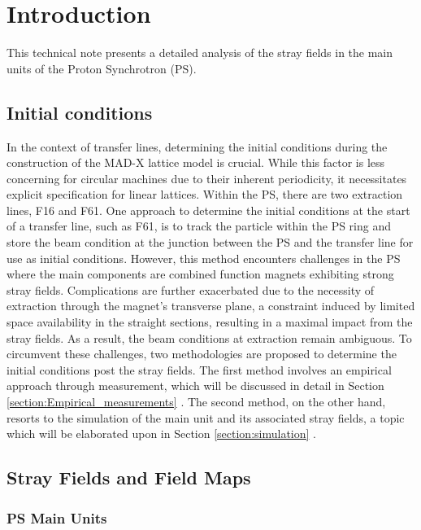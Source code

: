 \section{Introduction}

This technical note presents a detailed analysis of the stray fields in the main units of the Proton Synchrotron (PS).

\subsection{Initial conditions}

In the context of transfer lines, determining the initial conditions during the construction of the MAD-X lattice model is crucial. While this factor is less concerning for circular machines due to their inherent periodicity, it necessitates explicit specification for linear lattices. Within the PS, there are two extraction lines, F16 and F61. One approach to determine the initial conditions at the start of a transfer line, such as F61, is to track the particle within the PS ring and store the beam condition at the junction between the PS and the transfer line for use as initial conditions. However, this method encounters challenges in the PS where the main components are combined function magnets exhibiting strong stray fields. Complications are further exacerbated due to the necessity of extraction through the magnet's transverse plane, a constraint induced by limited space availability in the straight sections, resulting in a maximal impact from the stray fields. As a result, the beam conditions at extraction remain ambiguous. To circumvent these challenges, two methodologies are proposed to determine the initial conditions post the stray fields. The first method involves an empirical approach through measurement, which will be discussed in detail in Section \ref{section:Empirical_measurements} . The second method, on the other hand, resorts to the simulation of the main unit and its associated stray fields, a topic which will be elaborated upon in Section \ref{section:simulation} .

\subsection{Stray Fields and Field Maps}
\subsubsection{PS Main Units}

